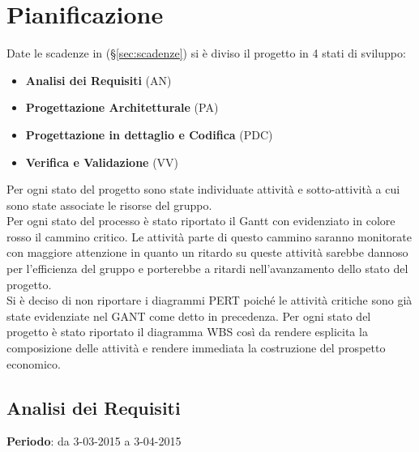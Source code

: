\section{Pianificazione}{
	Date le scadenze in (\S \ref{sec:scadenze}) si è diviso il progetto in 4 stati di sviluppo:
	\begin{itemize}
		\item \textbf{Analisi dei Requisiti} (AN)
		\item \textbf{Progettazione Architetturale} (PA)
		\item \textbf{Progettazione in dettaglio e Codifica} (PDC)
		\item \textbf{Verifica e Validazione} (VV)
	\end{itemize}
	
	Per ogni stato del progetto sono state individuate attività e sotto-attività a cui sono state associate le risorse del gruppo.\\
	Per ogni stato del processo è stato riportato il Gantt con evidenziato in colore rosso il cammino critico. Le attività parte di questo cammino saranno monitorate con maggiore attenzione in quanto un ritardo su queste attività	sarebbe dannoso per l'efficienza del gruppo e porterebbe a ritardi nell'avanzamento dello stato del progetto.\\
	Si è deciso di non riportare i diagrammi PERT poiché le attività critiche sono già state evidenziate nel GANT come detto in precedenza.
	Per ogni stato del progetto è stato riportato il diagramma WBS così da rendere esplicita la composizione delle attività e rendere immediata la costruzione del prospetto economico.
	
\newpage
\subsection{Analisi dei Requisiti}{
	\textbf{Periodo}: da 3-03-2015 a 3-04-2015 \\
	
}}
